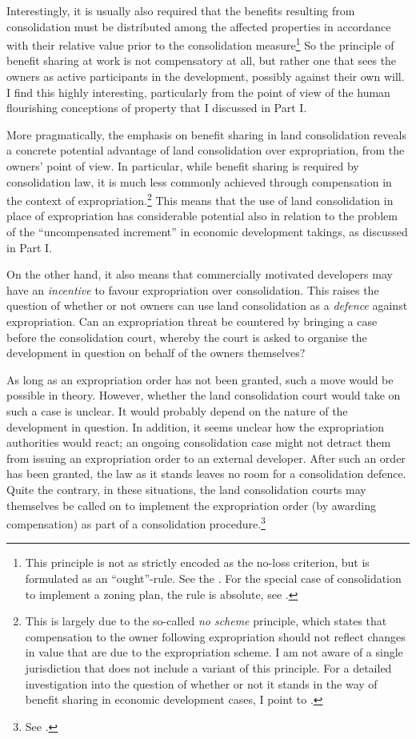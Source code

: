 Interestingly, it is usually also required that the benefits resulting from consolidation must be distributed  among the affected properties in accordance with their relative value prior to the consolidation measure\footnote{This principle is not as strictly encoded as the no-loss criterion, but is formulated as an ``ought''-rule. See the \cite[31|41]{lca79}. For the special case of consolidation to implement a zoning plan, the rule is absolute, see \cite[3 b)]{lca79}.} So the principle of benefit sharing at work is not compensatory at all, but rather one that sees the owners as active participants in the development, possibly against their own will. I find this highly interesting, particularly from the point of view of the human flourishing conceptions of property that I discussed in Part I.

More pragmatically, the emphasis on benefit sharing in land consolidation reveals a concrete potential advantage of land consolidation over expropriation, from the owners' point of view. In particular, while benefit sharing is required by consolidation law, it is much less commonly achieved through compensation in the context of expropriation.\footnote{This is largely due to the so-called {\it no scheme} principle, which states that compensation to the owner following expropriation should not reflect changes in value that are due to the expropriation scheme. I am not aware of a single jurisdiction that does not include a variant of this principle. For a detailed investigation into the question of whether or not it stands in the way of benefit sharing in economic development cases, I point to \cite{dyrkolbotn15}.} This means that the use of land consolidation in place of expropriation has considerable potential also in relation to the problem of the ``uncompensated increment'' in economic development takings, as discussed in Part I.

On the other hand, it also means that commercially motivated developers may have an {\it incentive} to favour expropriation over consolidation. This raises the question of whether or not owners can use land consolidation as a {\it defence} against expropriation. Can an expropriation threat be countered by bringing a case before the consolidation court, whereby the court is asked to organise the development in question on behalf of the owners themselves?

As long as an expropriation order has not been granted, such a move would be possible in theory. However, whether the land consolidation court would take on such a case is unclear. It would probably depend on the nature of the development in question. In addition, it seems unclear how the expropriation authorities would react; an ongoing consolidation case might not detract them from issuing an expropriation order to an external developer. After such an order has been granted, the law as it stands leaves no room for a consolidation defence. Quite the contrary, in these situations, the land consolidation courts may themselves be called on to implement the expropriation order (by awarding compensation) as part of a consolidation procedure.\footnote{See \cite[6]{lca79}.}

